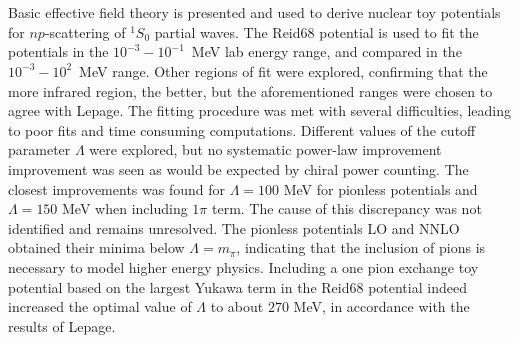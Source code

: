 
\makeatletter
\renewenvironment{abstract}{%
    \if@twocolumn
      \section*{\abstractname}%
    \else %
      \begin{center}%
        {\bfseries \large\abstractname\vspace{\z@}}%
      \end{center}%
      \quotation
    \fi}
    {\if@twocolumn\else\endquotation\fi}
\makeatother

\begin{abstract}

  Basic effective field theory is presented and used to derive nuclear
  toy potentials for \(np\)-scattering of \(^{1}S_{0}\) partial waves. The
  Reid68 potential is used to fit the potentials in the
  \mbox{\(10^{-3}-10^{-1}\) MeV} lab energy range, and compared in the
  \mbox{\(10^{-3}-10^{2}\) MeV} range. Other regions of fit were explored,
  confirming that the more infrared region, the better, but the
  aforementioned ranges were chosen to agree with Lepage. The fitting procedure
  was met with several difficulties, leading to poor fits and time consuming computations.
  Different values of the cutoff parameter
  \(\Lambda\) were explored, but no systematic power-law improvement
  improvement was seen as would be expected by chiral power counting. The
  closest improvements was found for \(\Lambda=100\) MeV for pionless potentials
  and \(\Lambda=150\) MeV when including \(1\pi\) term. The cause
  of this discrepancy was not identified and remains unresolved. The pionless potentials LO and NNLO
  obtained their minima below \(\Lambda = m_{\pi}\), indicating that the
  inclusion of pions is necessary to model higher energy physics. Including a
  one pion exchange toy potential based on the largest Yukawa term in the Reid68
  potential indeed increased the optimal value of \(\Lambda\) to about \(270\)
  MeV, in accordance with the results of Lepage.
\end{abstract}

